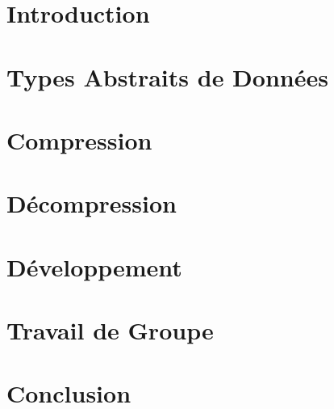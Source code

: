 \documentclass[10pt]{report}
\begin{document}
	
    
	
    \tableofcontents
	
    \chapter{Introduction} 
        
    
    \chapter{Types Abstraits de Données}
        

    \chapter{Compression}
        
    
    \chapter{Décompression}
        

    \chapter{Développement}
        

    \chapter{Travail de Groupe}
        

    \chapter{Conclusion}
        
\end{document}
